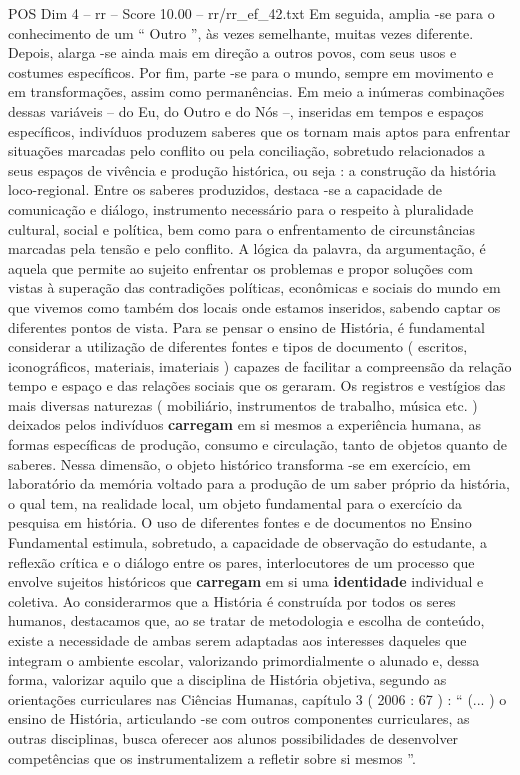 \begin{textsample}{POS Dim 4 – rr – Score 10.00 – rr/rr\_ef\_42.txt}
Em seguida, amplia -se para o conhecimento de um “ Outro ”, às vezes semelhante, muitas vezes diferente.
Depois, alarga -se ainda mais em direção a outros povos, com seus usos e costumes específicos.
Por fim, parte -se para o mundo, sempre em movimento e em transformações, assim como permanências.
Em meio a inúmeras combinações dessas variáveis – do Eu, do Outro e do Nós –, inseridas em tempos e espaços específicos, indivíduos produzem saberes que os tornam mais aptos para enfrentar situações marcadas pelo conflito ou pela conciliação, sobretudo relacionados a seus espaços de vivência e produção histórica, ou seja : a construção da história loco-regional.
Entre os saberes produzidos, destaca -se a capacidade de comunicação e diálogo, instrumento necessário para o respeito à pluralidade cultural, social e política, bem como para o enfrentamento de circunstâncias marcadas pela tensão e pelo conflito.
A lógica da palavra, da argumentação, é aquela que permite ao sujeito enfrentar os problemas e propor soluções com vistas à superação das contradições políticas, econômicas e sociais do mundo em que vivemos como também dos locais onde estamos inseridos, sabendo captar os diferentes pontos de vista.
Para se pensar o ensino de História, é fundamental considerar a utilização de diferentes fontes e tipos de documento ( escritos, iconográficos, materiais, imateriais ) capazes de facilitar a compreensão da relação tempo e espaço e das relações sociais que os geraram.
Os registros e vestígios das mais diversas naturezas ( mobiliário, instrumentos de trabalho, música etc. ) deixados pelos indivíduos \textbf{carregam} em si mesmos a experiência humana, as formas específicas de produção, consumo e circulação, tanto de objetos quanto de saberes.
Nessa dimensão, o objeto histórico transforma -se em exercício, em laboratório da memória voltado para a produção de um saber próprio da história, o qual tem, na realidade local, um objeto fundamental para o exercício da pesquisa em história.
O uso de diferentes fontes e de documentos no Ensino Fundamental estimula, sobretudo, a capacidade de observação do estudante, a reflexão crítica e o diálogo entre os pares, interlocutores de um processo que envolve sujeitos históricos que \textbf{carregam} em si uma \textbf{identidade} individual e coletiva.
Ao considerarmos que a História é construída por todos os seres humanos, destacamos que, ao se tratar de metodologia e escolha de conteúdo, existe a necessidade de ambas serem adaptadas aos interesses daqueles que integram o ambiente escolar, valorizando primordialmente o alunado e, dessa forma, valorizar aquilo que a disciplina de História objetiva, segundo as orientações curriculares nas Ciências Humanas, capítulo 3 ( 2006 : 67 ) : “ (... ) o ensino de História, articulando -se com outros componentes curriculares, as outras disciplinas, busca oferecer aos alunos possibilidades de desenvolver competências que os instrumentalizem a refletir sobre si mesmos ”.

\end{textsample}
